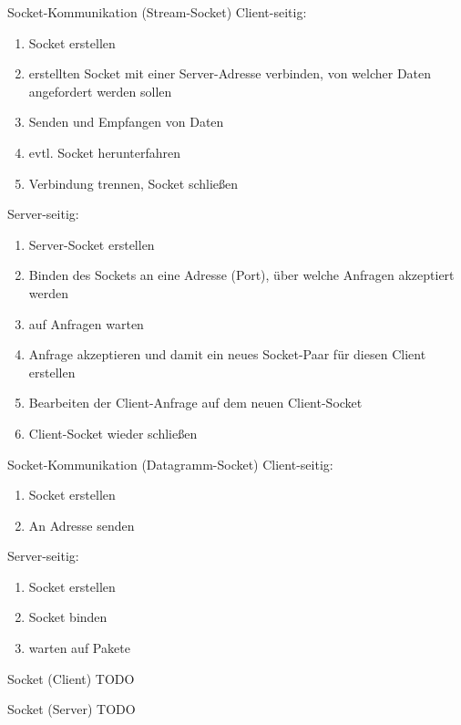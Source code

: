 \begin{defi}{Socket-Kommunikation (Stream-Socket)}
    Client-seitig:
    \begin{enumerate}
        \item Socket erstellen
        \item erstellten Socket mit einer Server-Adresse verbinden, von welcher Daten angefordert werden sollen
        \item Senden und Empfangen von Daten
        \item evtl. Socket herunterfahren
        \item Verbindung trennen, Socket schließen
    \end{enumerate}

    Server-seitig:
    \begin{enumerate}
        \item Server-Socket erstellen
        \item Binden des Sockets an eine Adresse (Port), über welche Anfragen akzeptiert werden
        \item auf Anfragen warten
        \item Anfrage akzeptieren und damit ein neues Socket-Paar für diesen Client erstellen
        \item Bearbeiten der Client-Anfrage auf dem neuen Client-Socket
        \item Client-Socket wieder schließen
    \end{enumerate}
\end{defi}

\begin{defi}{Socket-Kommunikation (Datagramm-Socket)}
    Client-seitig:
    \begin{enumerate}
        \item Socket erstellen
        \item An Adresse senden
    \end{enumerate}

    Server-seitig:
    \begin{enumerate}
        \item Socket erstellen
        \item Socket binden
        \item warten auf Pakete
    \end{enumerate}
\end{defi}

\begin{example}{Socket (Client)}
    TODO
\end{example}

\begin{example}{Socket (Server)}
    TODO
\end{example}